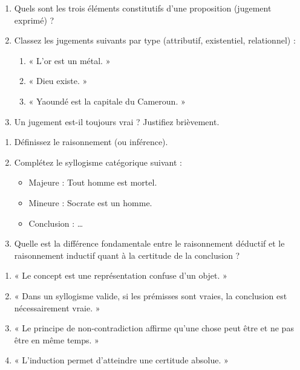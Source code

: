 \documentclass[11pt]{article}
\begin{document}
\begin{exercice}
\begin{enumerate}
    \item Quels sont les trois éléments constitutifs d'une proposition (jugement exprimé) ?
    \item Classez les jugements suivants par type (attributif, existentiel, relationnel) :
    \begin{enumerate}
        \item « L'or est un métal. »
        \item « Dieu existe. »
        \item « Yaoundé est la capitale du Cameroun. »
    \end{enumerate}
    \item Un jugement est-il toujours vrai ? Justifiez brièvement.
\end{enumerate}
\end{exercice}

\begin{exercice}
\begin{enumerate}
    \item Définissez le raisonnement (ou inférence).
    \item Complétez le syllogisme catégorique suivant :
    \begin{itemize}
        \item Majeure : Tout homme est mortel.
        \item Mineure : Socrate est un homme.
        \item Conclusion : \ldots
    \end{itemize}
    \item Quelle est la différence fondamentale entre le raisonnement déductif et le raisonnement inductif quant à la certitude de la conclusion ?
\end{enumerate}
\end{exercice}

\begin{exercice}
\begin{enumerate}
    \item « Le concept est une représentation confuse d'un objet. »
    \item « Dans un syllogisme valide, si les prémisses sont vraies, la conclusion est nécessairement vraie. »
    \item « Le principe de non-contradiction affirme qu'une chose peut être et ne pas être en même temps. »
    \item « L'induction permet d'atteindre une certitude absolue. »
\end{enumerate}
\end{exercice}
\end{document}
